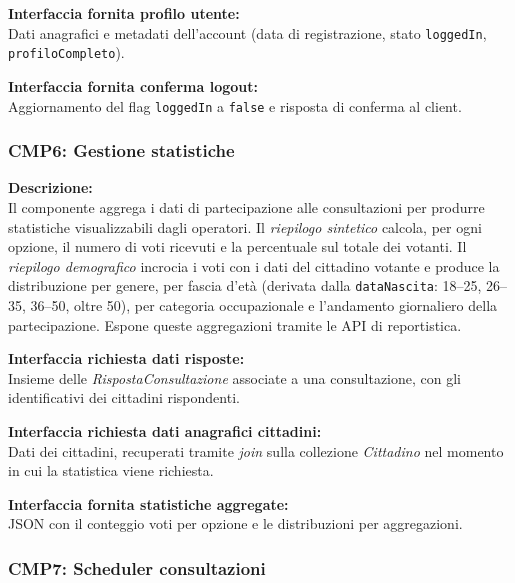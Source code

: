 \documentclass[12pt, a4paper]{article}
\newcommand{\interfacciarichiesta}[1]{\textbf{Interfaccia richiesta #1:}}
\newcommand{\interfacciafornita}[1]{\textbf{Interfaccia fornita #1:}}
\begin{document}
\interfacciafornita{profilo utente}\\
Dati anagrafici e metadati dell'account (data di registrazione, stato \texttt{loggedIn},
\texttt{profiloCompleto}).

\interfacciafornita{conferma logout}\\
Aggiornamento del flag \texttt{loggedIn} a \texttt{false} e risposta di conferma al client.

\subsubsection*{CMP6: Gestione statistiche}

\textbf{Descrizione:}\\
Il componente aggrega i dati di partecipazione alle consultazioni per produrre statistiche
visualizzabili dagli operatori. Il \textit{riepilogo sintetico} calcola, per ogni opzione, il numero
di voti ricevuti e la percentuale sul totale dei votanti. Il \textit{riepilogo demografico} incrocia
i voti con i dati del cittadino votante e produce la distribuzione per genere, per fascia d'età
(derivata dalla \texttt{dataNascita}: 18--25, 26--35, 36--50, oltre 50), per categoria occupazionale
e l'andamento giornaliero della partecipazione. Espone queste aggregazioni tramite le API di
reportistica.

\interfacciarichiesta{dati risposte}\\
Insieme delle \textit{RispostaConsultazione} associate a una consultazione, con gli identificativi
dei cittadini rispondenti.

\interfacciarichiesta{dati anagrafici cittadini}\\
Dati dei cittadini, recuperati tramite \textit{join} sulla collezione \textit{Cittadino} nel momento
in cui la statistica viene richiesta.

\interfacciafornita{statistiche aggregate}\\
JSON con il conteggio voti per opzione e le distribuzioni per aggregazioni.

\subsubsection*{CMP7: Scheduler consultazioni}
\end{document}
